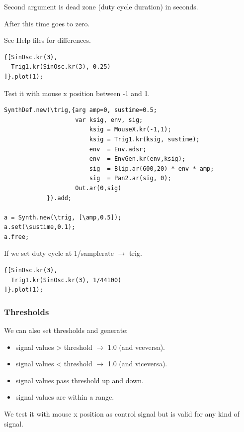 Second argument is dead zone (duty cycle duration) in seconds.

After this time goes to zero.

See Help files for differences.

\begin{lstlisting}[frame=single] 
{[SinOsc.kr(3), 
  Trig1.kr(SinOsc.kr(3), 0.25)
]}.plot(1);
\end{lstlisting}  

Test it with mouse x position between -1 and 1.

\begin{lstlisting}[frame=single] 
SynthDef.new(\trig,{arg amp=0, sustime=0.5;
                    var ksig, env, sig;
                        ksig = MouseX.kr(-1,1);
                        ksig = Trig1.kr(ksig, sustime);
                        env  = Env.adsr;
                        env  = EnvGen.kr(env,ksig); 
                        sig  = Blip.ar(600,20) * env * amp;
                        sig  = Pan2.ar(sig, 0); 
                    Out.ar(0,sig)
            }).add;
            
a = Synth.new(\trig, [\amp,0.5]);
a.set(\sustime,0.1);
a.free;
\end{lstlisting} 

If we set duty cycle at 1/samplerate \(\rightarrow\) trig.

\begin{lstlisting}[frame=single] 
{[SinOsc.kr(3), 
  Trig1.kr(SinOsc.kr(3), 1/44100)
]}.plot(1);
\end{lstlisting} 

\subsubsection{Thresholds}\label{thresholds}

We can also set thresholds and generate:

\begin{itemize}
\tightlist
\item signal values > threshold \(\rightarrow\) 1.0 (and vceversa).
\item signal values < threshold \(\rightarrow\) 1.0 (and viceversa).
\item signal values pass threshold up and down.
\item signal values are within a range.
\end{itemize}

We test it with mouse x position as control signal but is valid for any kind of signal.


